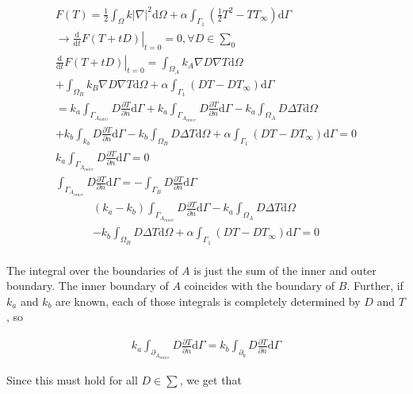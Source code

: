 \begin{gather*}
F(T) = \frac{1}{2}\int_{\Omega}k\left|\nabla\right|^2\mathrm{d}\Omega + \alpha \int_{\Gamma_1}\left(\frac{1}{2}T^2-TT_{\infty}\right)\mathrm{d}\Gamma\\
\rightarrow \left.\frac{\mathrm{d}}{\mathrm{d}t}F(T+tD)\right|_{t=0} = 0, \forall D \in \sum_0\\
\left.\frac{\mathrm{d}}{\mathrm{d}t}F(T+tD)\right|_{t=0} =  \int_{\Omega_A}k_A\nabla D \nabla T \mathrm{d}\Omega\\ + \int_{\Omega_B}k_B\nabla D \nabla T \mathrm{d}\Omega + \alpha \int_{\Gamma_1}\left(DT-DT_{\infty}\right)\mathrm{d}\Gamma\\
= k_a\int_{\Gamma_{A_{outer}}}D\frac{\partial T}{\partial n}\mathrm{d}\Gamma + k_a\int_{\Gamma_{A_{inner}}}D\frac{\partial T}{\partial n}\mathrm{d}\Gamma - k_a\int_{\Omega_A}D\Delta T \mathrm{d}\Omega \\
+ k_b \int_{k_b}D\frac{\partial T}{\partial n}\mathrm{d}\Gamma - k_b\int_{\Omega_B}D\Delta T \mathrm{d}\Omega + \alpha \int_{\Gamma_1}\left(DT-DT_{\infty}\right)\mathrm{d}\Gamma = 0\\
k_a\int_{\Gamma_{A_{outer}}}D\frac{\partial T}{\partial n}\mathrm{d}\Gamma = 0\\
\int_{\Gamma_{A_{inner}}}D\frac{\partial T}{\partial n}\mathrm{d}\Gamma = -\int_{\Gamma_{B}}D\frac{\partial T}{\partial n}\mathrm{d}\Gamma
\end{gather*}
\begin{gather*}
\left(k_a-k_b\right)\int_{\Gamma_{A_{inner}}}D\frac{\partial T}{\partial n}\mathrm{d}\Gamma - k_a\int_{\Omega_A}D\Delta T \mathrm{d}\Omega\\ - k_b\int_{\Omega_B}D\Delta T \mathrm{d}\Omega + \alpha \int_{\Gamma_1}\left(DT-DT_{\infty}\right)\mathrm{d}\Gamma = 0\\
\end{gather*}


The integral over the boundaries of $A$ is just the sum of the inner and outer boundary. The inner boundary of $A$ coincides with the boundary of $B$. Further, if $k_a$ and $k_b$ are known, each of those integrals is completely determined by $D$ and $T$, so 

\begin{gather*}
k_a\int_{\partial_{A_{inner}}}D\frac{\partial T}{\partial n} \mathrm{d}\Gamma = k_b\int_{\partial_{b}}D\frac{\partial T}{\partial n} \mathrm{d}\Gamma
\end{gather*}

Since this must hold for all $D \in \sum$, we get that

